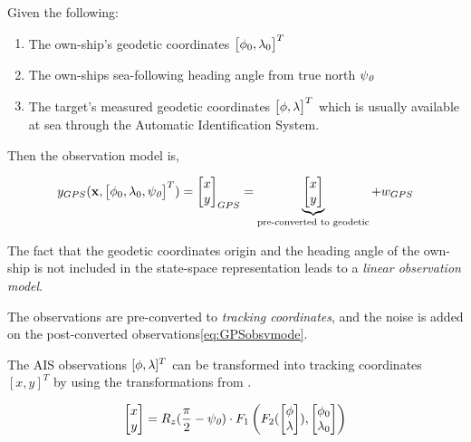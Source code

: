 Given the following:

\begin{enumerate}
\item The own-ship's geodetic coordinates $\begin{bmatrix}{\phi}_{0}, {\lambda}_{0} \end{bmatrix}^{T}$
\item The own-ships sea-following heading angle from true north ${\psi}_{\textit{0}}$
\item The target's measured geodetic coordinates $\begin{bmatrix}{\phi}, {\lambda}\end{bmatrix}^{T}$ which is usually available at sea through the Automatic Identification System.
\end{enumerate}

Then the observation model is,


\begin{equation}\label{eq:GPSobsvmode}
{{y}}_{GPS}(\mathbf{x},\begin{bmatrix}{\phi}_{0}, {\lambda}_{0}, {\psi}_{\textit{0}} \end{bmatrix}^{T}) = \begin{bmatrix}
x \\
y
\end{bmatrix}_{GPS} = \underbrace{\begin{bmatrix}
x \\
y
\end{bmatrix}}_{\text{pre-converted to geodetic}} + {w}_{GPS}
\end{equation}

The fact that the geodetic coordinates origin and the heading angle of the own-ship is not included in the state-space representation leads to a \emph{linear observation model}.

The observations are pre-converted to \emph{tracking coordinates}, and the noise is added on the post-converted observations\eqref{eq:GPSobsvmode}.

The AIS observations $[{\phi}, {\lambda}]^{T}$ can be transformed into tracking coordinates $[x,y]^{T}$ by using the transformations from .


\begin{equation}
\begin{bmatrix}
x \\
y
\end{bmatrix} = R_z(\frac{\pi}{2}-{\psi}_{\textit{0}}) \cdot F_1\left(F_2(\begin{bmatrix}
{\phi} \\
{\lambda}
\end{bmatrix}),\begin{bmatrix}
{\phi}_0 \\ {\lambda}_0
\end{bmatrix}\right)
\end{equation}

